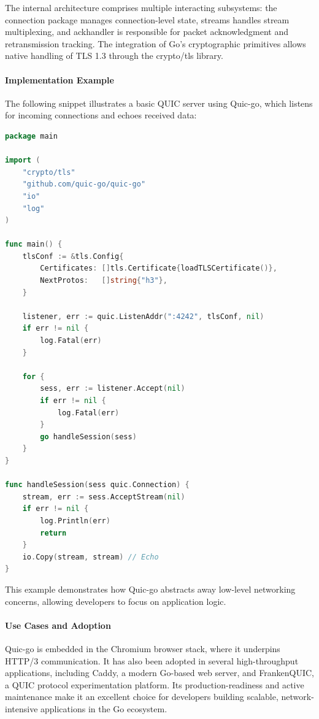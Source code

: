 The internal architecture comprises multiple interacting subsystems: the connection package manages connection-level state, streams handles stream multiplexing, and ackhandler is responsible for packet acknowledgment and retransmission tracking. The integration of Go's cryptographic primitives allows native handling of TLS 1.3 through the crypto/tls library.

\paragraph{Implementation Example}
The following snippet illustrates a basic QUIC server using Quic-go, which listens for incoming connections and echoes received data:

\begin{lstlisting}[language=go]
package main

import (
    "crypto/tls"
    "github.com/quic-go/quic-go"
    "io"
    "log"
)

func main() {
    tlsConf := &tls.Config{
        Certificates: []tls.Certificate{loadTLSCertificate()},
        NextProtos:   []string{"h3"},
    }

    listener, err := quic.ListenAddr(":4242", tlsConf, nil)
    if err != nil {
        log.Fatal(err)
    }

    for {
        sess, err := listener.Accept(nil)
        if err != nil {
            log.Fatal(err)
        }
        go handleSession(sess)
    }
}

func handleSession(sess quic.Connection) {
    stream, err := sess.AcceptStream(nil)
    if err != nil {
        log.Println(err)
        return
    }
    io.Copy(stream, stream) // Echo
}
\end{lstlisting}

This example demonstrates how Quic-go abstracts away low-level networking concerns, allowing developers to focus on application logic.

\paragraph{Use Cases and Adoption}
Quic-go is embedded in the Chromium browser stack, where it underpins HTTP/3 communication. It has also been adopted in several high-throughput applications, including Caddy, a modern Go-based web server, and FrankenQUIC, a QUIC protocol experimentation platform. Its production-readiness and active maintenance make it an excellent choice for developers building scalable, network-intensive applications in the Go ecosystem.

